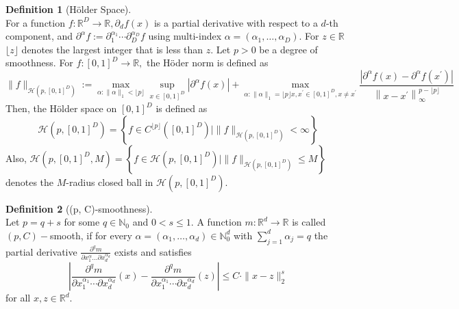 \documentclass[12pt]{article}
\theoremstyle{myplain}
\theoremstyle{definition}
\theoremstyle{definition}
\newtheorem{definition}{Definition}
\theoremstyle{remark}
\numberwithin{equation}{section}
\begin{document}
\begin{definition}[Hölder Space]\label{def:holder}\ \\
For a function $f: \mathbb{R}^{D} \rightarrow \mathbb{R}, \partial_{d} f(x)$ is a partial derivative with respect to a $d$-th component, and $\partial^{\alpha} f:=\partial_{1}^{\alpha_{1}} \cdots \partial_{D}^{\alpha_{D}} f$ using multi-index $\alpha=\left(\alpha_{1}, \ldots, \alpha_{D}\right) .$ For $z \in \mathbb{R}$
$\lfloor z\rfloor$ denotes the largest integer that is less than $z$. Let $p>0$ be a degree of smoothness. For $f:[0,1]^{D} \rightarrow \mathbb{R},$ the Höder norm is defined as
$$
\|f\|_{\mathcal{H}\left( p ,[0,1]^{D}\right)}:=\max _{\alpha:\|\alpha\|_{1}<\lfloor p \rfloor} \sup _{x \in[0,1]^{D}}\left|\partial^{\alpha} f(x)\right|+\max _{\alpha:\|\alpha\|_{1}=\lfloor p \rfloor x, x^{\prime} \in[0,1]^{D}, x \neq x^{\prime}} \frac{\left|\partial^{\alpha} f(x)-\partial^{\alpha} f\left(x^{\prime}\right)\right|}{\left\|x-x^{\prime}\right\|_{\infty}^{ p -\lfloor p \rfloor}}
$$
Then, the Hölder space on $[0,1]^{D}$ is defined as
$$
\mathcal{H}\left( p ,[0,1]^{D}\right)=\left\{f \in C^{\lfloor p \rfloor}\left([0,1]^{D}\right) \mid\|f\|_{\mathcal{H}\left( p ,[0,1]^{D}\right)}<\infty\right\}
$$
Also, $\mathcal{H}\left( p ,[0,1]^{D}, M\right)=\left\{f \in \mathcal{H}\left( p ,[0,1]^{D}\right) \mid\|f\|_{\mathcal{H}\left( p ,[0,1]^{D}\right)} \leq M\right\}$ denotes the $M$-radius closed
ball in $\mathcal{H}\left( p ,[0,1]^{D}\right)$.
\end{definition}

\begin{definition}[(p, C)-smoothness]\label{def:pCsmooth}\ \\
Let $p=q+s$ for some $q \in \mathbb{N}_0$ and $0<s \leq 1$. A function $m: \mathbb{R}^{d} \rightarrow \mathbb{R}$ is called $(p, C)-$smooth, if for every $\alpha=\left(\alpha_{1}, \ldots, \alpha_{d}\right) \in \mathbb{N}_0^{d}$ with
$\sum_{j=1}^{d} \alpha_{j}=q$ the partial derivative $\frac{\partial^{q} m}{\partial x_{1}^{\alpha} \ldots \partial x_{d}^{\alpha_{d}}}$ exists and satisfies
$$
\left|\frac{\partial^{q} m}{\partial x_{1}^{\alpha_{1}} \cdots \partial x_{d}^{\alpha_{d}}}(x)-\frac{\partial^{q} m}{\partial x_{1}^{\alpha_{1}} \cdots \partial x_{d}^{\alpha_{d}}}(z)\right| \leq C \cdot\|x-z\|_2^{s}
$$
for all $x, z \in \mathbb{R}^{d}$.
\end{definition}
\end{document}
